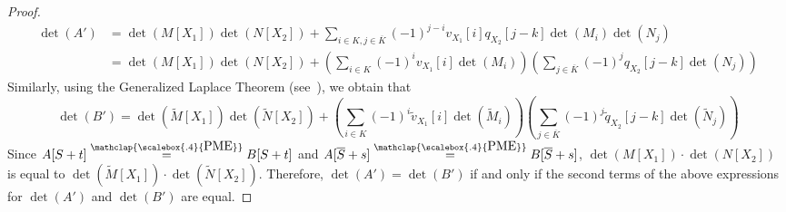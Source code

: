 \documentclass[11pt,letterpaper]{article}
\newcommand{\comp}[1]{\overline{#1}}
\newcommand{\PME}{\stackrel{\mathclap{\scalebox{.4}{\mbox{PME}}}}{=}}
\begin{document}
{{{\begin{proof}
\begin{align*}
\det(A') &= \det(M[X_1])\det(N[X_2]) + \sum_{i\in K,j\in \comp{K}}(-1)^{j-i}v_{X_1}            [i]q_{X_2}[j-k]\det(M_i)\det(N_j)\\
        &= \det(M[X_1])\det(N[X_2])+\left(\sum_{i\in K}(-1)^{i} v_{X_1}[i]\det(M_i)\right)\left(\sum_{j\in \comp{K}}(-1)^{j} q_{X_2}[j-k]\det(N_j)\right)
\end{align*}
Similarly, using the Generalized Laplace Theorem (see~\cite[Theorem~3.1]{Ahmadieh23}), we obtain that 
$$\det(B')=\det(\widetilde M[X_1])\det(\widetilde N[X_2])+\left(\sum_{i\in K}(-1)^{i} \tilde v_{X_1}[i]\det(\widetilde M_i)\right)\left(\sum_{j\in \comp{K}}(-1)^{j} \tilde q_{X_2}[j-k]\det(\widetilde N_j)\right)$$ 
Since $A[S+t]\PME B[S+t]$ and $A[\comp{S}+s]\PME B[\comp{S}+s]$, $\det(M[X_1])\cdot \det(N[X_2])$ is equal to $\det(\widetilde M[X_1])\cdot \det(\widetilde N[X_2])$. Therefore, $\det(A')=\det(B')$ if and only if the second terms of the above expressions for $\det(A')$ and $\det(B')$ are equal. 



\end{proof}}}}
\end{document}
